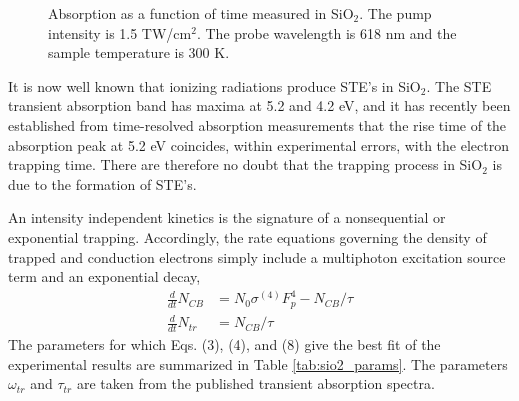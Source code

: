 \documentclass[aps,prb,reprint]{revtex4-2}
\begin{document}
\begin{figure}[ht]
    \centering
    \caption{Absorption as a function of time measured in SiO$_2$. The pump intensity is 1.5 TW/cm$^2$. The probe wavelength is 618 nm and the sample temperature is 300 K.}
    \label{fig:sio2_abs}
\end{figure}

It is now well known that ionizing radiations produce STE's in SiO$_2$.\cite{25,26} The STE transient absorption band has maxima at 5.2 and 4.2 eV,\cite{16,17} and it has recently been established from time-resolved absorption measurements that the rise time of the absorption peak at 5.2 eV coincides, within experimental errors, with the electron trapping time.\cite{6} There are therefore no doubt that the trapping process in SiO$_2$ is due to the formation of STE's.

An intensity independent kinetics is the signature of a nonsequential or exponential trapping. Accordingly, the rate equations governing the density of trapped and conduction electrons simply include a multiphoton excitation source term and an exponential decay,
\begin{align}
\frac{d}{dt} N_{CB} &= N_0 \sigma^{(4)} F_p^4 - N_{CB}/\tau \\
\frac{d}{dt} N_{tr} &= N_{CB}/\tau
\end{align}
The parameters for which Eqs. (3), (4), and (8) give the best fit of the experimental results are summarized in Table \ref{tab:sio2_params}. The parameters $\omega_{tr}$ and $\tau_{tr}$ are taken from the published transient absorption spectra.\cite{16}
\end{document}

